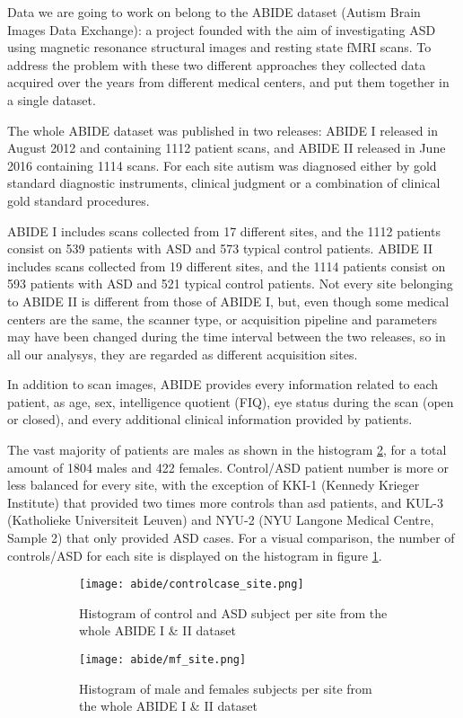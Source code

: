 \documentclass[10pt]{report}
\begin{document}
Data we are going to work on belong to the ABIDE dataset (Autism Brain Images Data Exchange): a project founded with the aim of investigating ASD using magnetic resonance structural images and resting state fMRI scans.
To address the problem with these two different approaches they collected data acquired over the years from different medical centers, and put them together in a single dataset.

The whole ABIDE dataset was published in two releases: ABIDE I released in August 2012 and containing 1112 patient scans, and ABIDE II released in June 2016 containing 1114 scans.
For each site autism was diagnosed either by gold standard diagnostic instruments, clinical judgment or a combination of clinical gold standard procedures.

ABIDE I includes scans collected from 17 different sites, and the 1112 patients consist on 539 patients with ASD and 573 typical control patients.
ABIDE II includes scans collected from 19 different sites, and the 1114 patients consist on 593 patients with ASD and 521 typical control patients.
Not every site belonging to ABIDE II is different from those of ABIDE I, but, even though some medical centers are the same, the scanner type, or acquisition pipeline and parameters may have been changed during the time interval between the two releases, so in all our analysys, they are regarded as different acquisition sites.

In addition to scan images, ABIDE provides every information related to each patient, as age, sex, intelligence quotient (FIQ), eye status during the scan (open or closed), and every additional clinical information provided by patients.

The vast majority of patients are males as shown in the histogram \ref{fig:mf_site}, for a total amount of 1804 males and 422 females.
Control/ASD patient number is more or less balanced for every site, with the exception of KKI-1 (Kennedy Krieger Institute) that provided two times more controls than asd patients, and KUL-3 (Katholieke Universiteit Leuven) and NYU-2 (NYU Langone Medical Centre, Sample 2) that only provided ASD cases. For a visual comparison, the number of controls/ASD for each site is displayed on the histogram in figure \ref{fig:controlcase_site}.

\begin{figure}[h]
\centering
\begin{subfigure}{0.9\textwidth}
\texttt{[image: abide/controlcase\_site.png]}
\caption{Histogram of control and ASD subject per site from the whole ABIDE I \& II dataset}
\label{fig:controlcase_site}
\end{subfigure}
\begin{subfigure}{0.9\textwidth}
\texttt{[image: abide/mf\_site.png]}
\caption{Histogram of male and females subjects per site from the whole ABIDE I \& II dataset}
\label{fig:mf_site}
\end{subfigure}
\caption{}
\label{}
\end{figure}
\end{document}
